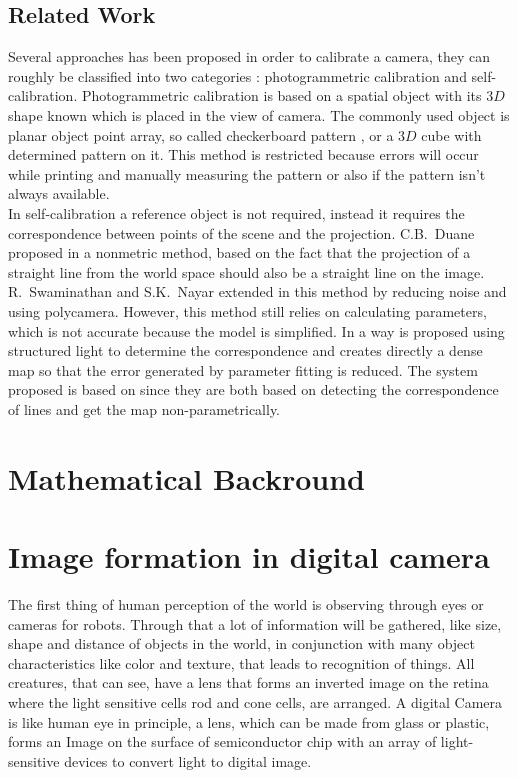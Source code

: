 \documentclass[journal,final,a4paper,twoside]{PS}
\begin{document}
\subsection{Related Work}
\label{sec:related}
Several approaches has been proposed in order to calibrate a camera, they can roughly be classified into two categories \cite{Zhang}: photogrammetric calibration and self-calibration.
Photogrammetric calibration is based on a spatial object with its $3D$ shape known which is placed in the view of camera. The commonly used object is planar object point array, so called checkerboard pattern \cite{Zhang}, or a $3D$ cube with determined pattern on it. This method is restricted because errors will occur while printing and manually measuring the pattern or also if the pattern isn't always available.\\
In self-calibration \cite{Faugeras} a reference object is not required, instead it requires the correspondence between points of the scene and the projection. C.B.~Duane proposed in \cite{Duane} a nonmetric method, based on the fact that the projection of a straight line from the world space should also be a straight line on the image. R.~Swaminathan and S.K.~Nayar extended in \cite{Swaminathan} this method by reducing noise and using polycamera. However, this method still relies on calculating parameters, which is not accurate because the model is simplified. 
In \cite{Sagawa} a way is proposed using structured light to determine the correspondence and creates directly a dense map so that the error generated by parameter fitting is reduced. 
The system proposed is based on \cite{Sagawa} since they are both based on detecting the correspondence of lines and get the map non-parametrically. %

\section{Mathematical Backround}
\label{sec:maths}







\section{Image formation in digital camera}
\label{sec:imageFormation}
The first thing of human perception of the world is observing through eyes or cameras for robots. Through that a lot of information will be gathered, like size, shape and distance of objects in the world, in conjunction with many object characteristics like color and texture, that leads to recognition of things.
All creatures, that can see, have a lens that forms an inverted image on the retina where the light sensitive cells rod and cone cells, are arranged. A digital Camera is like human eye in principle, a lens, which can be made from glass or plastic, forms an Image on the surface of semiconductor chip with an array of light-sensitive devices to convert light to digital image.
\end{document}
